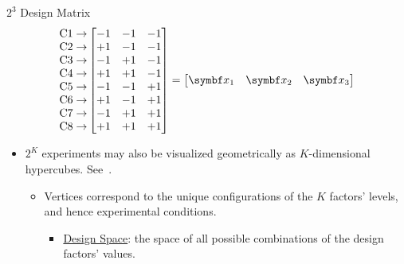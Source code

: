 \begin{Example}{$ 2^3 $ Design Matrix}{}
      \[ \begin{matrix}
                  \text{C1}\rightarrow \\
                  \text{C2}\rightarrow \\
                  \text{C3}\rightarrow \\
                  \text{C4}\rightarrow \\
                  \text{C5}\rightarrow \\
                  \text{C6}\rightarrow \\
                  \text{C7}\rightarrow \\
                  \text{C8}\rightarrow
            \end{matrix}\begin{bmatrix}
                  -1 & -1 & -1 \\
                  +1 & -1 & -1 \\
                  -1 & +1 & -1 \\
                  +1 & +1 & -1 \\
                  -1 & -1 & +1 \\
                  +1 & -1 & +1 \\
                  -1 & +1 & +1 \\
                  +1 & +1 & +1
            \end{bmatrix}=\begin{bmatrix}
                  \Vector{x}_1 & \Vector{x}_2 & \Vector{x}_3
            \end{bmatrix} \]
\end{Example}
\begin{itemize}[$\rightarrow$]
      \item $ 2^K $ experiments may also be visualized geometrically as $ K $-dimensional hypercubes. See~.
            \begin{itemize}
                  \item Vertices correspond to the unique configurations of the $ K $ factors' levels,
                        and hence experimental conditions.
                        \begin{itemize}[label={}]
                              \item \underline{Design Space}: the space of all possible combinations of the design factors' values.
                        \end{itemize}
            \end{itemize}
\end{itemize}
